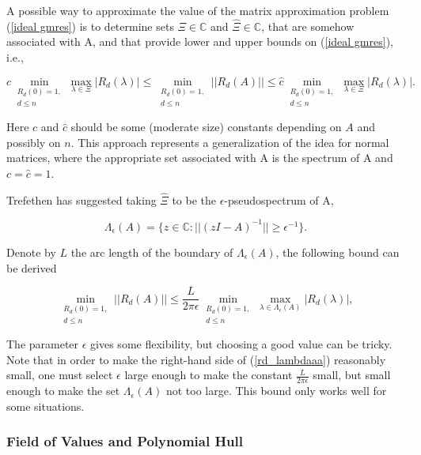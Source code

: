 {	A possible way to approximate the value of the matrix approximation problem (\ref{ideal gmres}) is to determine sets $\Xi \in \mathbb{C}$ and $\hat{\Xi} \in \mathbb{C}$, that are somehow associated with A, and that provide lower and upper bounds on (\ref{ideal gmres}), i.e.,
	
	\begin{equation}
	c \min_{\substack{R_d(0)=1, \\ d \leq n}} \max_{\lambda \in \Xi} |R_d(\lambda)| \leq \min_{\substack{R_d(0)=1, \\ d \leq n}} ||R_d(A)|| \leq \hat{c} \min_{\substack{R_d(0)=1, \\ d \leq n}} \max_{\lambda \in \Xi} |R_d(\lambda)|.
	\end{equation}
	
	Here $c$ and $\hat{c}$ should be some (moderate size) constants depending on $A$ and possibly on $n$. This approach represents a generalization of the idea for normal matrices, where the appropriate set associated with A is the spectrum of A and $c=\hat{c}=1$.
	
	Trefethen \cite{trefethen1990approximation} has suggested taking $\hat{\Xi}$ to be the $\epsilon$-pseudospectrum of A,
	
	\begin{equation}
	\Lambda_{\epsilon}(A)=\{z \in \mathbb{C}: ||(zI-A)^{-1}|| \geq \epsilon^{-1}\}.
	\end{equation}
	
	Denote by $L$ the arc length of the boundary of $\Lambda_{\epsilon}(A)$, the following bound can be derived
	
	\begin{equation}
	\label{rd_lambdaaa}
	\min_{\substack{R_d(0)=1, \\ d \leq n}}||R_d(A)|| \leq \frac{L}{2\pi \epsilon} \min_{\substack{R_d(0)=1, \\ d \leq n}}\max_{\lambda \in     \Lambda_{\epsilon}(A)} |R_d(\lambda)|,
	\end{equation}
	
	The parameter $\epsilon$ gives some flexibility, but choosing a good value can be tricky. Note that in order to make the right-hand side of (\ref{rd_lambdaaa}) reasonably small, one must select $\epsilon$ large enough to make the constant $\frac{L}{2\pi \epsilon}$ small, but small enough to make the set  $\Lambda_{\epsilon}(A)$ not too large. This bound only works well for some situations.
	
	\subsubsection{Field of Values and Polynomial Hull}
	
}
